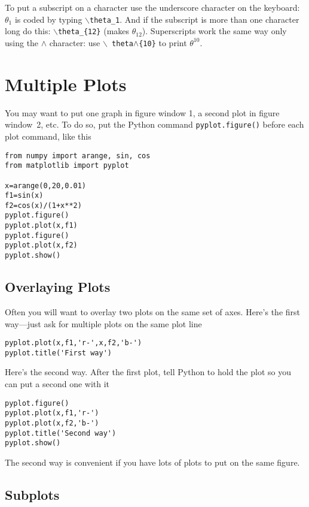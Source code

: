  To put a subscript on a character
use the underscore character on the keyboard: $\theta_1$ is coded
by typing $\backslash${\tt theta\_1}. And if the subscript is more
than one character long do this: $\backslash${\tt theta\_\{12\}}
(makes $\theta_{12}$). Superscripts work the same way only using
the {\tt $\wedge$} character: use $\backslash${\tt
theta$\wedge$\{10\}} to print $\theta^{10}$.


\section{Multiple Plots}

  You may want to put
one graph in figure window 1, a second plot in figure window~2,
etc. To do so, put the Python command {\tt pyplot.figure()} before each plot
command, like this
\begin{Verbatim}
from numpy import arange, sin, cos
from matplotlib import pyplot

x=arange(0,20,0.01)
f1=sin(x)
f2=cos(x)/(1+x**2)
pyplot.figure()
pyplot.plot(x,f1)
pyplot.figure()
pyplot.plot(x,f2)
pyplot.show()
\end{Verbatim}

\subsection*{Overlaying Plots}
  Often you will want to
overlay two plots on the same set of axes.
Here's the first way---just ask for multiple plots on the
same plot line
\begin{Verbatim}
pyplot.plot(x,f1,'r-',x,f2,'b-')
pyplot.title('First way')
\end{Verbatim}
Here's the second way. After the first plot, tell Python
to hold the plot so you can put a second one with it
\begin{Verbatim}
pyplot.figure()
pyplot.plot(x,f1,'r-')
pyplot.plot(x,f2,'b-')
pyplot.title('Second way')
pyplot.show()
\end{Verbatim}
The second way is convenient if you have lots of plots to put on
the same figure.  

\subsection*{Subplots}

